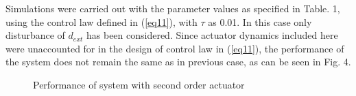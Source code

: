 \documentclass[conference]{IEEEtran}
\begin{document}
Simulations were carried out with the parameter values as specified in Table. 1, using the control law defined in (\ref{eq11}), with $\tau$ as 0.01. In this case only disturbance of $d_{ext}$ has been considered. Since actuator dynamics included here were unaccounted for in the design of control law in (\ref{eq11}), the performance of the system does not remain the same as in previous case, as can be seen in Fig. 4. 

%
\begin{figure}[h]
\begin{center}
%
	\caption{Performance of system with second order actuator}  
\label{fig4}
\end{center}
\end{figure}
\end{document}
